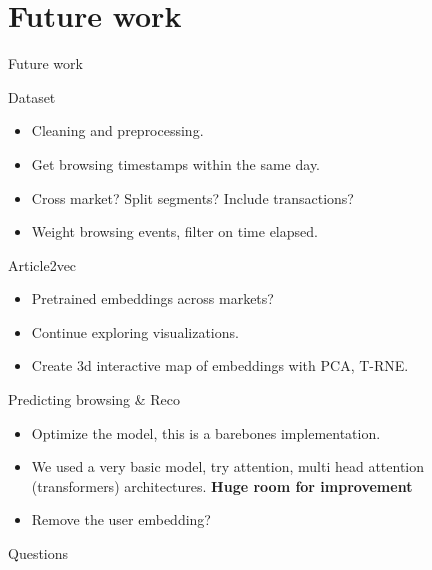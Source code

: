 \documentclass{beamer}
\begin{document}
\section{Future work}
\begin{frame}{Future work}
\begin{block}{Dataset}
\begin{itemize}
    \item Cleaning and preprocessing.
    \item Get browsing timestamps within the same day.
    \item Cross market? Split segments? Include transactions?
    \item Weight browsing events, filter on time elapsed.
\end{itemize}
\end{block}

\begin{block}{Article2vec}
\begin{itemize}
\item Pretrained embeddings across markets?
\item Continue exploring visualizations.
\item Create 3d interactive map of embeddings with PCA, T-RNE.
\end{itemize}
\end{block}

\begin{block}{Predicting browsing \& Reco}
\begin{itemize}
    \item Optimize the model, this is a barebones implementation.
    \item We used a very basic model, try attention, multi head attention (transformers) architectures.  \textbf{Huge room for improvement}
    \item Remove the user embedding?
\end{itemize}
\end{block}
\end{frame}

\begin{frame}
\Huge{\centerline{Questions}}
\end{frame}
\end{document}
